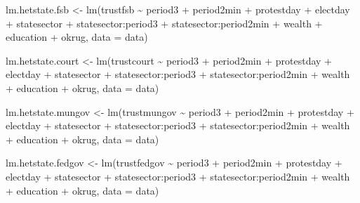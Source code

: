 \documentclass[
  letterpaper,
  DIV=11,
  numbers=noendperiod]{scrartcl}
\newenvironment{Shaded}{\begin{snugshade}}{\end{snugshade}}
\newcommand{\AttributeTok}[1]{\textcolor[rgb]{0.40,0.45,0.13}{#1}}
\newcommand{\FunctionTok}[1]{\textcolor[rgb]{0.28,0.35,0.67}{#1}}
\newcommand{\NormalTok}[1]{\textcolor[rgb]{0.00,0.23,0.31}{#1}}
\newcommand{\OtherTok}[1]{\textcolor[rgb]{0.00,0.23,0.31}{#1}}
\newcommand{\SpecialCharTok}[1]{\textcolor[rgb]{0.37,0.37,0.37}{#1}}
\begin{document}
\begin{Shaded}
\begin{Highlighting}[]
\NormalTok{lm.hetstate.fsb }\OtherTok{\textless{}{-}} \FunctionTok{lm}\NormalTok{(trustfsb }\SpecialCharTok{\textasciitilde{}}\NormalTok{ period3 }\SpecialCharTok{+}\NormalTok{ period2min }\SpecialCharTok{+}\NormalTok{ protestday }\SpecialCharTok{+}\NormalTok{ electday }\SpecialCharTok{+}
\NormalTok{                        statesector }\SpecialCharTok{+}\NormalTok{ statesector}\SpecialCharTok{:}\NormalTok{period3 }\SpecialCharTok{+}\NormalTok{ statesector}\SpecialCharTok{:}\NormalTok{period2min }\SpecialCharTok{+}
\NormalTok{                        wealth }\SpecialCharTok{+}\NormalTok{ education }\SpecialCharTok{+}\NormalTok{ okrug, }\AttributeTok{data =}\NormalTok{ data)}

\NormalTok{lm.hetstate.court }\OtherTok{\textless{}{-}} \FunctionTok{lm}\NormalTok{(trustcourt }\SpecialCharTok{\textasciitilde{}}\NormalTok{ period3 }\SpecialCharTok{+}\NormalTok{ period2min }\SpecialCharTok{+}\NormalTok{ protestday }\SpecialCharTok{+}\NormalTok{ electday }\SpecialCharTok{+}
\NormalTok{                          statesector }\SpecialCharTok{+}\NormalTok{ statesector}\SpecialCharTok{:}\NormalTok{period3 }\SpecialCharTok{+}\NormalTok{ statesector}\SpecialCharTok{:}\NormalTok{period2min }\SpecialCharTok{+}
\NormalTok{                          wealth }\SpecialCharTok{+}\NormalTok{ education }\SpecialCharTok{+}\NormalTok{ okrug, }\AttributeTok{data =}\NormalTok{ data)}

\NormalTok{lm.hetstate.mungov }\OtherTok{\textless{}{-}} \FunctionTok{lm}\NormalTok{(trustmungov }\SpecialCharTok{\textasciitilde{}}\NormalTok{ period3 }\SpecialCharTok{+}\NormalTok{ period2min }\SpecialCharTok{+}\NormalTok{ protestday }\SpecialCharTok{+}\NormalTok{ electday }\SpecialCharTok{+}
\NormalTok{                           statesector }\SpecialCharTok{+}\NormalTok{ statesector}\SpecialCharTok{:}\NormalTok{period3 }\SpecialCharTok{+}\NormalTok{ statesector}\SpecialCharTok{:}\NormalTok{period2min }\SpecialCharTok{+}
\NormalTok{                           wealth }\SpecialCharTok{+}\NormalTok{ education }\SpecialCharTok{+}\NormalTok{ okrug, }\AttributeTok{data =}\NormalTok{ data)}

\NormalTok{lm.hetstate.fedgov }\OtherTok{\textless{}{-}} \FunctionTok{lm}\NormalTok{(trustfedgov }\SpecialCharTok{\textasciitilde{}}\NormalTok{ period3 }\SpecialCharTok{+}\NormalTok{ period2min }\SpecialCharTok{+}\NormalTok{ protestday }\SpecialCharTok{+}\NormalTok{ electday }\SpecialCharTok{+}
\NormalTok{                           statesector }\SpecialCharTok{+}\NormalTok{ statesector}\SpecialCharTok{:}\NormalTok{period3 }\SpecialCharTok{+}\NormalTok{ statesector}\SpecialCharTok{:}\NormalTok{period2min }\SpecialCharTok{+}
\NormalTok{                           wealth }\SpecialCharTok{+}\NormalTok{ education }\SpecialCharTok{+}\NormalTok{ okrug, }\AttributeTok{data =}\NormalTok{ data)}


\end{Highlighting}
\end{Shaded}
\end{document}
